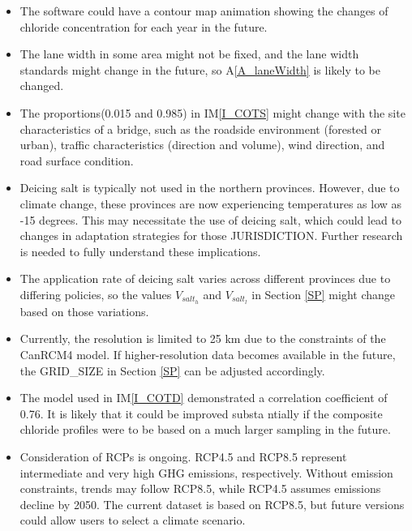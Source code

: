 \documentclass[12pt]{article}
\newcommand{\aref}[1]{A\ref{#1}}
\newcommand{\iref}[1]{IM\ref{#1}}
\newcounter{lcnum} %
\begin{document}
\noindent \begin{itemize}
\item[LC\refstepcounter{lcnum}\thelcnum\label{LC_contourmap}:] The software could have a contour map animation showing the changes of chloride concentration for each year in the future.
\item[LC\refstepcounter{lcnum}\thelcnum\label{LC_laneWidth}:] The lane width in some area might not be fixed, and the lane width standards might change in the future, so \aref{A_laneWidth} is likely to be changed. 
\item[LC\refstepcounter{lcnum}\thelcnum\label{LC_SASC}:] The proportions(0.015 and 0.985) in \iref{I_COTS} might change with the site characteristics of a bridge, such as the roadside environment (forested or urban), traffic characteristics (direction and volume), wind direction, and road surface condition. 
\item[LC\refstepcounter{lcnum}\thelcnum\label{LC_northern}:] Deicing salt is typically not used in the northern provinces. However, due to climate change, these provinces are now experiencing temperatures as low as -15 degrees. This may necessitate the use of deicing salt, which could lead to changes in adaptation strategies for those JURISDICTION. Further research is needed to fully understand these implications.
\item[LC\refstepcounter{lcnum}\thelcnum\label{LC_salt}:] The application rate of deicing salt varies across different provinces due to differing policies, so the values $V_{salt_{h}}$ and $V_{salt_{l}}$ in Section \ref{SP} might change based on those variations.
\item[LC\refstepcounter{lcnum}\thelcnum\label{LC_resolution}:] Currently, the resolution is limited to 25 km due to the constraints of the CanRCM4 model. If higher-resolution data becomes available in the future, the GRID\_SIZE in Section \ref{SP} can be adjusted accordingly.
\item[LC\refstepcounter{lcnum}\thelcnum\label{LC_linearRegression}:] The model used in \iref{I_COTD} demonstrated a correlation coefficient of 0.76. It is likely that it could be improved substa ntially if the composite chloride profiles were to be based on a much larger sampling in the future.
\item[LC\refstepcounter{lcnum}\thelcnum\label{LC_RCP}:] Consideration of RCPs is ongoing. RCP4.5 and RCP8.5 represent intermediate and very high GHG emissions, respectively. Without emission constraints, trends may follow RCP8.5, while RCP4.5 assumes emissions decline by 2050. The current dataset is based on RCP8.5, but future versions could allow users to select a climate scenario.
\end{itemize}
\end{document}
